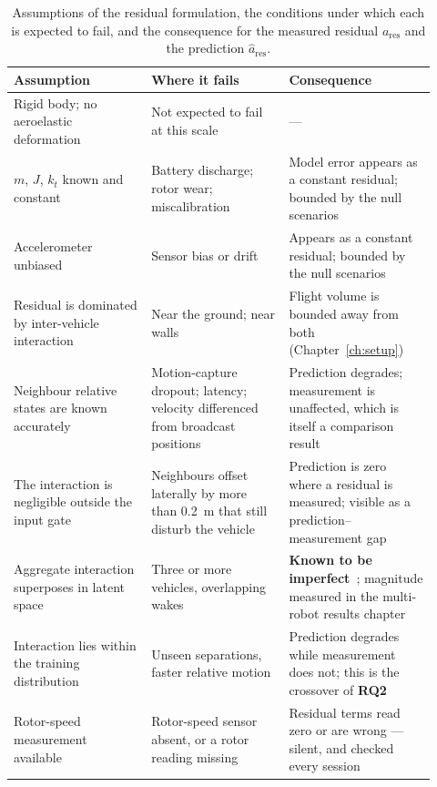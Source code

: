 \begin{table}[t]
  \centering
  \caption{Assumptions of the residual formulation, the conditions under which each is expected to
    fail, and the consequence for the measured residual $a_{\mathrm{res}}$ and the prediction
    $\hat a_{\mathrm{res}}$.}
  \label{tab:model-assumptions}
  \small
  \begin{tabular}{@{}p{0.30\linewidth}p{0.30\linewidth}p{0.32\linewidth}@{}}
    \toprule
    Assumption & Where it fails & Consequence \\
    \midrule
    Rigid body; no aeroelastic deformation
      & Not expected to fail at this scale
      & --- \\
    $m$, $J$, $k_t$ known and constant
      & Battery discharge; rotor wear; miscalibration
      & Model error appears as a constant residual; bounded by the null scenarios \\
    Accelerometer unbiased
      & Sensor bias or drift
      & Appears as a constant residual; bounded by the null scenarios \\
    Residual is dominated by inter-vehicle interaction
      & Near the ground; near walls
      & Flight volume is bounded away from both (Chapter~\ref{ch:setup}) \\
    Neighbour relative states are known accurately
      & Motion-capture dropout; latency; velocity differenced from broadcast positions
      & Prediction degrades; measurement is unaffected, which is itself a comparison result \\
    The interaction is negligible outside the input gate
      & Neighbours offset laterally by more than \SI{0.2}{\metre} that still disturb the vehicle
      & Prediction is zero where a residual is measured; visible as a prediction--measurement gap \\
    Aggregate interaction superposes in latent space
      & Three or more vehicles, overlapping wakes
      & \textbf{Known to be imperfect}~\cite{shi2020neuralswarm,gielis2023aggregate}; magnitude measured in the multi-robot results chapter \\
    Interaction lies within the training distribution
      & Unseen separations, faster relative motion
      & Prediction degrades while measurement does not; this is the crossover of \textbf{RQ2} \\
    Rotor-speed measurement available
      & Rotor-speed sensor absent, or a rotor reading missing
      & Residual terms read zero or are wrong --- silent, and checked every session \\
    \bottomrule
  \end{tabular}
\end{table}

